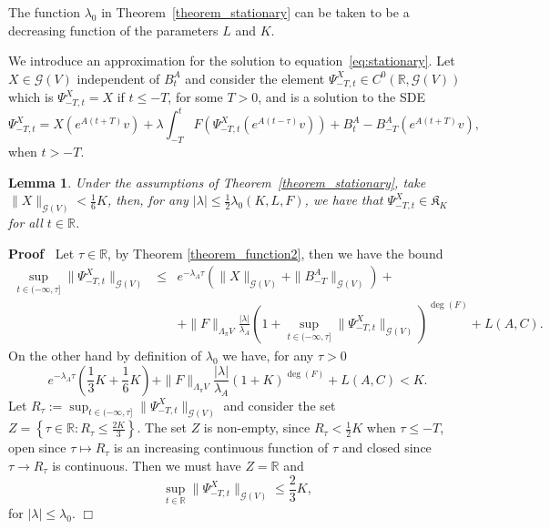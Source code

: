\documentclass{article}
\newcommand{\assign}{:=}
\newenvironment{proof}{\noindent\textbf{Proof\ }}{\hspace*{\fill}$\Box$\medskip}
\newtheorem{lemma}[theorem]{Lemma}
\begin{document}
\begin{remark}
  \label{remark_lambda0}The function $\lambda_0$ in
  Theorem~\ref{theorem_stationary} can be taken to be a decreasing function of
  the parameters $L$ and $K$.
\end{remark}

We introduce an approximation for the solution to
equation~{\eqref{eq:stationary}}. Let $X \in \mathcal{G} (V)$ independent of
$B^A_t$ and consider the element $\Psi_{- T, t}^X \in C^0 (\mathbb{R},
\mathcal{G} (V))$ which is $\Psi_{- T, t}^X = X$ if $t \leqslant - T$, for
some $T > 0$, and is a solution to the SDE
\[ \Psi_{- T, t}^X = X (e^{A (t + T)} v) + \lambda \int_{- T}^t F (\Psi_{- T,
   t}^X (e^{A (t - \tau)} v)) + B^A_t - B^A_{- T} (e^{A (t + T)} v), \]
when $t > - T$.

\begin{lemma}
  \label{lemma_bound}Under the assumptions of
  Theorem~\ref{theorem_stationary}, take $\| X \|_{\mathcal{G} (V)} <
  \frac{1}{6} K$, then, for any $| \lambda | \leqslant \frac{1}{2} \lambda_0
  (K, L, F)$, we have that $\Psi_{- T, t}^X \in \mathfrak{K}_K$ for all $t \in
  \mathbb{R}$.
\end{lemma}

\begin{proof}
  Let $\tau \in \mathbb{R}$, by Theorem \ref{theorem_function2}, then we have
  the bound
  \begin{eqnarray}
    \sup_{t \in (- \infty, \tau]} \| \Psi^X_{- T, t} \|_{\mathcal{G} (V)} &
    \leqslant & e^{- \lambda_A \tau} (\| X \|_{\mathcal{G} (V)} + \| B_{- T}^A
    \|_{\mathcal{G} (V)}) + \nonumber\\
    &  & + \| F \|_{\Lambda_{\pi} V} \frac{| \lambda |}{\lambda_A} (1 +
    \sup_{t \in (- \infty, \tau]} \| \Psi_{- T, t}^X \|_{\mathcal{G}
    (V)})^{\deg (F)} + L (A, C) . \nonumber
  \end{eqnarray}
  On the other hand by definition of $\lambda_0$ we have, for any $\tau > 0$
  \[ e^{- \lambda_A \tau} \left( \frac{1}{3} K + \frac{1}{6} K \right) + \| F
     \|_{\Lambda_{\pi} V} \frac{| \lambda |}{\lambda_A} (1 + K)^{\deg (F)} + L
     (A, C) < K. \]
  Let $R_{\tau} \assign \sup_{t \in (- \infty, \tau]} \| \Psi_{- T, t}^X
  \|_{\mathcal{G} (V)}$ and consider the set $Z = \left\{ \tau \in \mathbb{R}:
  R_{\tau} \leqslant \frac{2 K}{3} \right\}$. The set $Z$ is non-empty, since
  $R_{\tau} < \frac{1}{2} K$ when $\tau \leqslant - T$, open since $\tau
  \mapsto R_{\tau}$ is an increasing continuous function of $\tau$ and closed
  since $\tau \rightarrow R_{\tau}$ is continuous. Then we must have $Z
  =\mathbb{R}$ and
  \[ \sup_{t \in \mathbb{R}} \| \Psi_{- T, t}^X \|_{\mathcal{G} (V)}
     \leqslant \frac{2}{3} K, \]
  for $| \lambda | \leqslant \lambda_0$.
\end{proof}
\end{document}
